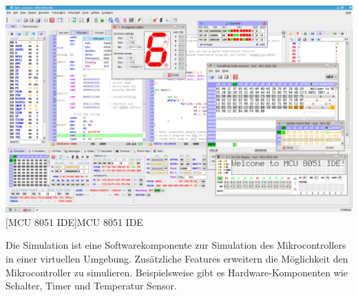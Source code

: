 	\begin{center}
		\includegraphics[width=\textwidth]{mcu8051ide.png}
		[MCU 8051 IDE]{MCU 8051 IDE} 
	\end{center}
	
	Die Simulation ist eine Softwarekomponente zur Simulation des Mikrocontrollers in einer virtuellen Umgebung. Zusätzliche Features erweitern die Möglichkeit den Mikrocontroller zu simulieren. Beispielsweise gibt es Hardware-Komponenten wie Schalter, Timer und Temperatur Sensor.
